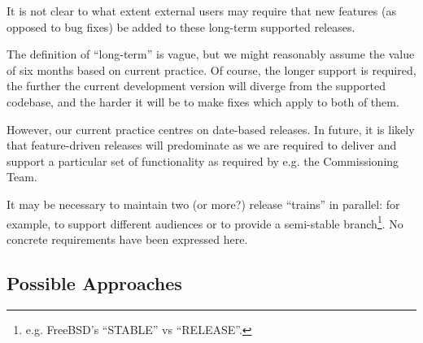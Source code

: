 \documentclass[letterpaper]{scrartcl}
\begin{document}
It is not clear to what extent external users may require that new features
(as opposed to bug fixes) be added to these long-term supported releases.

The definition of ``long-term'' is vague, but we might reasonably assume the
value of six months based on current practice. Of course, the longer support
is required, the further the current development version will diverge from the
supported codebase, and the harder it will be to make fixes which apply to
both of them.

However, our current practice centres on date-based releases. In future, it
is likely that feature-driven releases will predominate as we are required to
deliver and support a particular set of functionality as required by e.g. the
Commissioning Team.

It may be necessary to maintain two (or more?) release ``trains'' in parallel:
for example, to support different audiences or to provide a semi-stable
branch\footnote{e.g. FreeBSD's ``STABLE'' vs ``RELEASE''.}. No concrete
requirements have been expressed here.

\subsection{Possible Approaches}
\end{document}
